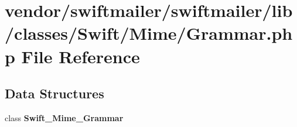 \section{vendor/swiftmailer/swiftmailer/lib/classes/\+Swift/\+Mime/\+Grammar.php File Reference}
\label{swiftmailer_2swiftmailer_2lib_2classes_2_swift_2_mime_2_grammar_8php}
\subsection*{Data Structures}
\begin{DoxyCompactItemize}
\item 
class {\bf Swift\+\_\+\+Mime\+\_\+\+Grammar}
\end{DoxyCompactItemize}
